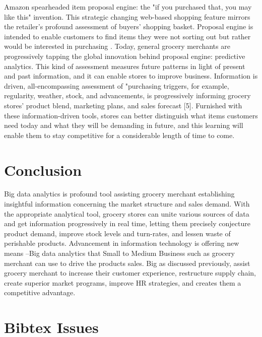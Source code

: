 \documentclass[sigconf]{acmart}
\begin{document}
Amazon spearheaded item proposal engine: the "if you purchased that, you may like this" invention. This strategic changing web-based shopping feature mirrors the retailer's profound assessment of buyers' shopping basket.  Proposal engine is intended to enable customers to find items they were not sorting out but rather would be interested in purchasing \cite{1}. Today, general grocery merchants are progressively tapping the global innovation behind proposal engine: predictive analytics. This kind of assessment measures future patterns in light of present and past information, and it can enable stores to improve business. Information is driven, all-encompassing assessment of "purchasing triggers, for example, regularity, weather, stock, and advancements, is progressively informing grocery stores' product blend, marketing plans, and sales forecast [5]. Furnished with these information-driven tools, stores can better distinguish what items customers need today and what they will be demanding in future, and this learning will enable them to stay competitive for a considerable length of time to come.  

\section{Conclusion}

Big data analytics is profound tool assisting grocery merchant establishing insightful information concerning the market structure and sales demand. With the appropriate analytical tool, grocery stores can unite various sources of data and get information progressively in real time, letting them precisely conjecture product demand, improve stock levels and turn-rates, and lessen waste of perishable products. Advancement in information technology is offering new means –Big data analytics that Small to Medium Business such as grocery merchant can use to drive the products sales. Big as discussed previously, assist grocery merchant to increase their customer experience, restructure supply chain, create superior market programs, improve HR strategies, and creates them a competitive advantage.


 

\section{Bibtex Issues}


\end{document}

